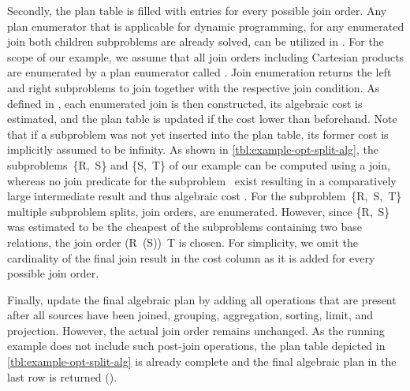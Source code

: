 Secondly, the plan table is filled with entries for every possible join order.  Any plan enumerator that is applicable for dynamic programming, \ie for any enumerated join both children subproblems are already solved, can be utilized in .  For the scope of our example, we assume that all join orders including Cartesian products are enumerated by a plan enumerator called \PEall.  Join enumeration returns the left and right subproblems to join together with the respective join condition.  As defined in , each enumerated join is then constructed, its algebraic cost is estimated, and the plan table is updated if the cost  lower than beforehand.  Note that if a subproblem was not yet inserted into the plan table, its former cost is implicitly assumed to be infinity.  As shown in \autoref{tbl:example-opt-split-alg}, the subproblems~\{R,~S\} and \{S,~T\} of our example can be computed using a join, whereas no join predicate for the subproblem~ exist resulting in a comparatively large intermediate result and thus algebraic cost \wrt \Cout.  For the subproblem~\{R,~S,~T\} multiple subproblem splits, \ie join orders, are enumerated.  However, since \{R,~S\} was estimated to be the cheapest of the subproblems containing two base relations, the join order (R~\join \filter(S))~\join T is chosen.  For simplicity, we omit the cardinality of the final join result in the cost column as it is added for every possible join order.

Finally,  update the final algebraic plan by adding all operations that are present after all sources have been joined, \ie grouping, aggregation, sorting, limit, and projection.  However, the actual join order remains unchanged.  As the running example does not include such post-join operations, the plan table depicted in \autoref{tbl:example-opt-split-alg} is already complete and the final algebraic plan in the last row is returned ().

